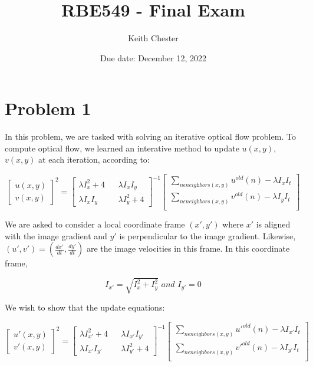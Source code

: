 \documentclass{article}
\title{RBE549 - Final Exam}
\author{Keith Chester}
\date{Due date: December 12, 2022}
\begin{document}
\maketitle

\section*{Problem 1}

In this problem, we are tasked with solving an iterative optical flow problem. To compute optical flow, we learned an interative method to update $u(x,y)$, $v(x,y)$ at each iteration, according to:

\begin{equation}
    \begin{bmatrix}
        u(x,y) \\ v(x,y)
    \end{bmatrix}^2 = \begin{bmatrix}
        \lambda I_x ^2 + 4 && \lambda I_x I_y \\
        \lambda I_x I_y && \lambda I_y^2 + 4
    \end{bmatrix}^{-1}
    \begin{bmatrix}
        \sum_{n\epsilon \textit{neighbors}(x,y)} u^{old}(n)-\lambda I_x I_t \\
        \sum_{n\epsilon \textit{neighbors}(x,y)} v^{old}(n)-\lambda I_y I_t \\
    \end{bmatrix}
\end{equation}

We are asked to consider a local coordinate frame $(x',y')$ where $x'$ is aligned with the image gradient and $y'$ is perpendicular to the image gradient. Likewise, $(u',v')=(\frac{dx'}{dt}, \frac{dy'}{dt})$ are the image velocities in this frame. In this coordinate frame,

\begin{equation}
    I_{x'} = \sqrt{I_x^2 + I_y^2}\textit{ and } I_{y'} = 0
\end{equation}

We wish to show that the update equations:

\begin{equation}
    \begin{bmatrix}
        u'(x,y) \\ v'(x,y)
    \end{bmatrix}^2 = \begin{bmatrix}
        \lambda I_{x'}^2 + 4 && \lambda I_{x'} I_{y'} \\
        \lambda I_{x'} I_{y'} && \lambda I_{y'}^2 + 4
    \end{bmatrix}^{-1}
    \begin{bmatrix}
        \sum_{n\epsilon \textit{neighbors}(x,y)} u'^{old}(n)-\lambda I_{x'} I_t \\
        \sum_{n\epsilon \textit{neighbors}(x,y)} v'^{old}(n)-\lambda I_{y'} I_t \\
    \end{bmatrix}
\end{equation}
\end{document}
